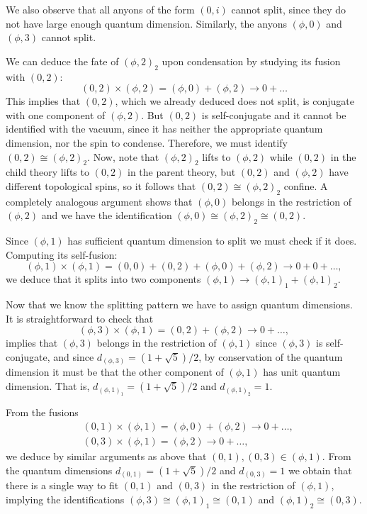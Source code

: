 \documentclass[11pt]{article}
\numberwithin{equation}{section}
\begin{document}
We also observe that all anyons of the form $(0,i)$ cannot split, since they do not have large enough quantum dimension. Similarly, the anyons $(\phi,0)$ and $(\phi,3)$ cannot split.

We can deduce the fate of $(\phi,2)_{2}$ upon condensation by studying its fusion with $(0,2)$:
\begin{equation}
    (0,2) \times (\phi,2) = (\phi,0) + (\phi,2) \longrightarrow 0 + \ldots
\end{equation}
This implies that $(0,2)$, which we already deduced does not split, is conjugate with one component of $(\phi,2)$. But $(0,2)$ is self-conjugate and it cannot be identified with the vacuum, since it has neither the appropriate quantum dimension, nor the spin to condense. Therefore, we must identify $(0,2) \cong (\phi,2)_{2}$. Now, note that $(\phi,2)_{2}$ lifts to $(\phi,2)$ while $(0,2)$ in the child theory lifts to $(0,2)$ in the parent theory, but $(0,2)$ and $(\phi,2)$ have different topological spins, so it follows that $(0,2) \cong (\phi,2)_{2}$ confine. A completely analogous argument shows that $(\phi,0)$ belongs in the restriction of $(\phi,2)$ and we have the identification $(\phi,0) \cong (\phi,2)_{2} \cong (0,2)$.

Since $(\phi,1)$ has sufficient quantum dimension to split we must check if it does. Computing its self-fusion:
\begin{equation}
    (\phi,1) \times (\phi,1) = (0,0) + (0,2) + (\phi,0) + (\phi,2) \longrightarrow 0 + 0 + \ldots,
\end{equation}
we deduce that it splits into two components $(\phi,1) \to (\phi,1)_{1} + (\phi,1)_{2}$.

Now that we know the splitting pattern we have to assign quantum dimensions. It is straightforward to check that
\begin{equation}
    (\phi,3) \times (\phi,1) = (0,2) + (\phi,2) \longrightarrow 0 + \ldots,
\end{equation}
implies that $(\phi,3)$ belongs in the restriction of $(\phi,1)$ since $(\phi,3)$ is self-conjugate, and since $d_{(\phi,3)} = (1 + \sqrt{5})/2$, by conservation of the quantum dimension it must be that the other component of $(\phi,1)$ has unit quantum dimension. That is, $d_{(\phi,1)_{1}} = (1 + \sqrt{5})/2$ and $d_{(\phi,1)_{2}} = 1$. 

From the fusions
\begin{align}
    &(0,1) \times (\phi,1) = (\phi,0) + (\phi,2) \longrightarrow 0 + \ldots, \\[0.3cm]
    &(0,3) \times (\phi,1) = (\phi,2) \longrightarrow 0 + \ldots,
\end{align}
we deduce by similar arguments as above that $(0,1),(0,3) \in (\phi,1)$. From the quantum dimensions $d_{(0,1)} = (1 + \sqrt{5})/2$ and $d_{(0,3)}=1$ we obtain that there is a single way to fit $(0,1)$ and $(0,3)$ in the restriction of $(\phi,1)$, implying the identifications $(\phi,3) \cong (\phi,1)_{1} \cong (0,1)$ and $(\phi,1)_{2} \cong (0,3)$. 
\end{document}
